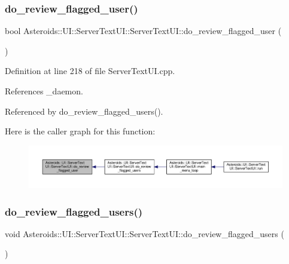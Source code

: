 \subsubsection{\texorpdfstring{do\+\_\+review\+\_\+flagged\+\_\+user()}{do\_review\_flagged\_user()}}
{\footnotesize\ttfamily bool Asteroids\+::\+U\+I\+::\+Server\+Text\+U\+I\+::\+Server\+Text\+U\+I\+::do\+\_\+review\+\_\+flagged\+\_\+user (\begin{DoxyParamCaption}{ }\end{DoxyParamCaption})\hspace{0.3cm}{\ttfamily [private]}}



Definition at line 218 of file Server\+Text\+U\+I.\+cpp.



References \+\_\+daemon.



Referenced by do\+\_\+review\+\_\+flagged\+\_\+users().

Here is the caller graph for this function\+:\nopagebreak
\begin{figure}[H]
\begin{center}
\leavevmode
\includegraphics[width=350pt]{classAsteroids_1_1UI_1_1ServerTextUI_1_1ServerTextUI_af85d5a35efcb8c75fe7b5419da0d6f93_icgraph}
\end{center}
\end{figure}
\mbox{\label{classAsteroids_1_1UI_1_1ServerTextUI_1_1ServerTextUI_a5518087c5d0ab9fd8c24c1b6948ee11b}} 
\subsubsection{\texorpdfstring{do\+\_\+review\+\_\+flagged\+\_\+users()}{do\_review\_flagged\_users()}}
{\footnotesize\ttfamily void Asteroids\+::\+U\+I\+::\+Server\+Text\+U\+I\+::\+Server\+Text\+U\+I\+::do\+\_\+review\+\_\+flagged\+\_\+users (\begin{DoxyParamCaption}{ }\end{DoxyParamCaption})\hspace{0.3cm}{\ttfamily [private]}}



